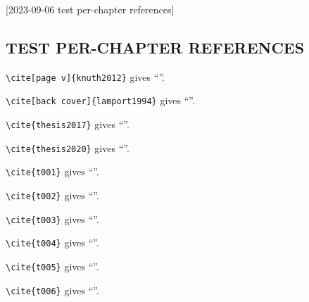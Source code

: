 [2023-09-06 test per-chapter references]

\begin{refsection}

\chapter{TEST PER-CHAPTER REFERENCES}

\verb+\cite[page v]{knuth2012}+ gives ``\cite[page v]{knuth2012}''.

\noindent
\verb+\cite[back cover]{lamport1994}+ gives ``\cite[back cover]{lamport1994}''.

\noindent
\verb+\cite{thesis2017}+ gives ``\cite{thesis2017}''.

\noindent
\verb+\cite{thesis2020}+ gives ``\cite{thesis2020}''.

\noindent
\verb+\cite{t001}+ gives ``\cite{t001}''.

\noindent
\verb+\cite{t002}+ gives ``\cite{t002}''.

\noindent
\verb+\cite{t003}+ gives ``\cite{t003}''.

\noindent
\verb+\cite{t004}+ gives ``\cite{t004}''.

\noindent
\verb+\cite{t005}+ gives ``\cite{t005}''.

\noindent
\verb+\cite{t006}+ gives ``\cite{t006}''.

\begin{singlespace}
  \PrintChapterBibliography
\end{singlespace}

\end{refsection}

